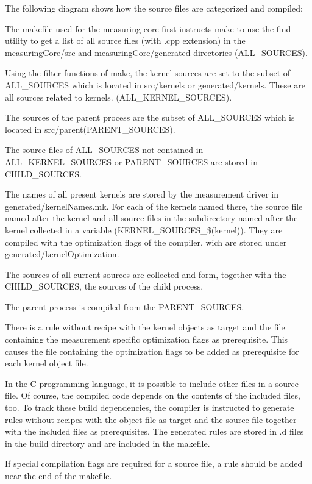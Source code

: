 \documentclass[a4paper,12pt]{report}
\newlength{\imgwidth}
\newcommand{\umlDiagram}[1]{%
	\settowidth{\imgwidth}{\texttt{[image: out/diagrams/\#1.pdf]}}%
	\setlength{\imgwidth}{\minof{0.5\imgwidth}{\textwidth}}%
	\par\vskip0.5cm\noindent\makebox[\textwidth][c]{%
	\texttt{[image: out/diagrams/\#1.pdf]}%
}\vskip0.5cm}
\begin{document}
The following diagram shows how the source files are categorized and compiled:

\umlDiagram{MeasuringCoreBuild}

The makefile used for the measuring core first instructs make to use the find
utility to get a list of all source files (with .cpp extension) in the
measuringCore/src and measuringCore/generated directories (ALL\_SOURCES).

Using the filter functions of make, the kernel sources are set to the subset of
ALL\_SOURCES which is located in src/kernels or generated/kernels. These are all sources related to kernels.
(ALL\_KERNEL\_SOURCES).

The sources of the parent process are the subset of ALL\_SOURCES which is
located in src/parent(PARENT\_SOURCES).

The source files of ALL\_SOURCES not contained in ALL\_KERNEL\_SOURCES or
PARENT\_SOURCES are stored in CHILD\_SOURCES.

The names of all present kernels are stored by the measurement driver in
generated/kernelNames.mk. For each of the kernels named there, the source file
named after the kernel and all source files in the subdirectory named after the
kernel collected in a variable (KERNEL\_SOURCES\_\$(kernel)). They are compiled
with the optimization flags of the compiler, wich are stored under
generated/kernelOptimization.

The sources of all current sources are collected and form, together with the
CHILD\_SOURCES, the sources of the child process.

The parent process is compiled from the PARENT\_SOURCES.

There is a rule without recipe with the kernel objects as target and the file
containing the measurement specific optimization flags as prerequisite. This
causes the file containing the optimization flags to be added as prerequisite
for each kernel object file.

In the C programming language, it is possible to include other files in a source
file. Of course, the compiled code depends on the contents of the included
files, too. To track these build dependencies, the compiler is instructed to
generate rules without recipes with the object file as target and the source
file together with the included files as prerequisites. The generated rules are
stored in .d files in the build directory and are included in the makefile.

If special compilation flags are required for a source file, a rule should be
added near the end of the makefile.
\end{document}
